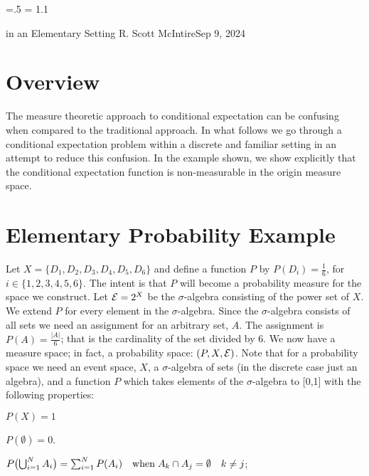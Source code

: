 




\parindent=0pt
\parskip=.5\baselineskip
\baselineskip = 1.1\baselineskip

\footline{\hss\tenrm\folio\hss}

        {in an Elementary Setting}
{R. Scott McIntire}{Sep 9, 2024}

\section{Overview}
The measure theoretic approach to conditional expectation can be confusing
when compared to the traditional approach.
In what follows we go through a conditional 
expectation problem within a discrete and familiar setting in an attempt 
to reduce this confusion. In the example shown, we show explicitly that the 
conditional expectation function is non-measurable in the origin 
measure space.


\section{Elementary Probability Example}
Let $X = \{D_1, D_2, D_3, D_4, D_5, D_6\}$ and define a function $P$ by 
$P(D_i) = \frac{1}{6}$, for $i\in \{1,2,3,4,5,6\}$. The intent is that $P$ will 
become a probability measure for the space we construct.
Let ${\cal E} = 2^X$ be the $\sigma$-algebra 
consisting of the power set of $X$. We extend $P$ for every element in the $\sigma$-algebra.
Since the $\sigma$-algebra consists of all sets 
we need an assignment for an arbitrary set, $A$. 
The assignment is $P(A) = \frac{|A|}{6}$; that is the cardinality of the set divided by 6.
We now have a measure space; in fact, a probability space: $(P,X,{\cal E})$.
Note that for a probability space we need an event space, $X$, a $\sigma$-algebra of sets 
(in the discrete case just an algebra), and a function $P$ which takes 
elements of the $\sigma$-algebra to [0,1] with the following properties:

\beginEnum
\item{$P(X) = 1$}
\item{$P(\emptyset) = 0$.}
\item{$
P\bigl(\mathop{\bigcup}_{i=1}^N A_i\bigr) = \sum_{i=1}^N P(A_i) 
\quad {\rm when}\;  A_k \cap A_j = \emptyset \quad k\neq j
$;}
\endEnum

